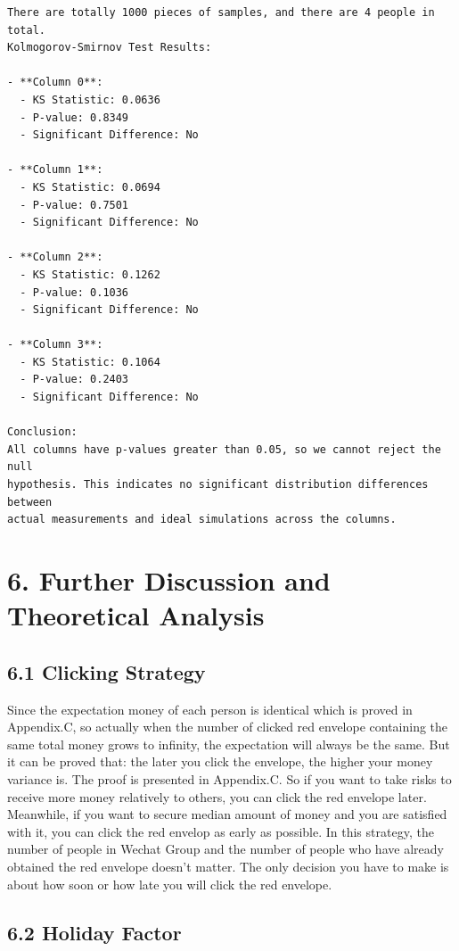 \documentclass[11pt]{article}
\begin{document}
    \begin{Verbatim}[commandchars=\\\{\}]
There are totally 1000 pieces of samples, and there are 4 people in total.
Kolmogorov-Smirnov Test Results:

- **Column 0**:
  - KS Statistic: 0.0636
  - P-value: 0.8349
  - Significant Difference: No

- **Column 1**:
  - KS Statistic: 0.0694
  - P-value: 0.7501
  - Significant Difference: No

- **Column 2**:
  - KS Statistic: 0.1262
  - P-value: 0.1036
  - Significant Difference: No

- **Column 3**:
  - KS Statistic: 0.1064
  - P-value: 0.2403
  - Significant Difference: No

Conclusion:
All columns have p-values greater than 0.05, so we cannot reject the null
hypothesis. This indicates no significant distribution differences between
actual measurements and ideal simulations across the columns.
    \end{Verbatim}

    \section*{6. Further Discussion and Theoretical Analysis}\label{further-discussion-and-theoretical-analysis}

\subsection*{6.1 Clicking Strategy}\label{clicking-strategy}

Since the expectation money of each person is identical which is proved
in Appendix.C, so actually when the number of clicked red envelope
containing the same total money grows to infinity, the expectation will
always be the same. But it can be proved that: the later you click the
envelope, the higher your money variance is. The proof is presented in
Appendix.C. So if you want to take risks to receive more money
relatively to others, you can click the red envelope later. Meanwhile,
if you want to secure median amount of money and you are satisfied with
it, you can click the red envelop as early as possible. In this
strategy, the number of people in Wechat Group and the number of people
who have already obtained the red envelope doesn't matter. The only
decision you have to make is about how soon or how late you will click
the red envelope.

\subsection*{6.2 Holiday Factor}
\end{document}
